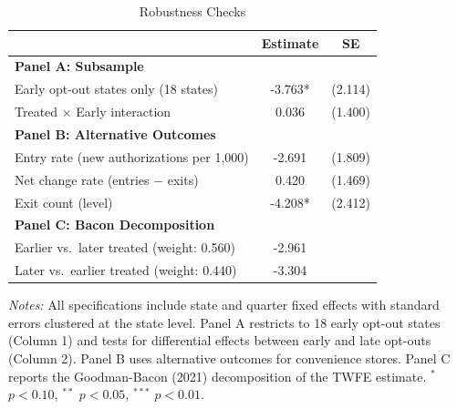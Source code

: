 \begin{table}[htbp]
\centering
\caption{Robustness Checks}
\label{tab:robust}
\begin{tabular}{lcc}
\toprule
 & Estimate & SE \\
\midrule
\textbf{Panel A: Subsample} & & \\
\quad Early opt-out states only (18 states) & -3.763* & (2.114) \\
\quad Treated $\times$ Early interaction & 0.036 & (1.400) \\
\addlinespace
\textbf{Panel B: Alternative Outcomes} & & \\
\quad Entry rate (new authorizations per 1,000) & -2.691 & (1.809) \\
\quad Net change rate (entries $-$ exits) & 0.420 & (1.469) \\
\quad Exit count (level) & -4.208* & (2.412) \\
\addlinespace
\textbf{Panel C: Bacon Decomposition} & & \\
\quad Earlier vs.~later treated (weight: 0.560) & -2.961 & \\
\quad Later vs.~earlier treated (weight: 0.440) & -3.304 & \\
\bottomrule
\end{tabular}
\begin{tablenotes}
\item \textit{Notes:} All specifications include state and quarter fixed effects with standard errors
clustered at the state level. Panel A restricts to 18 early opt-out states (Column 1) and tests for
differential effects between early and late opt-outs (Column 2). Panel B uses alternative outcomes
for convenience stores. Panel C reports the Goodman-Bacon (2021) decomposition of the TWFE estimate.
$^{*}$ $p < 0.10$, $^{**}$ $p < 0.05$, $^{***}$ $p < 0.01$.
\end{tablenotes}
\end{table}
